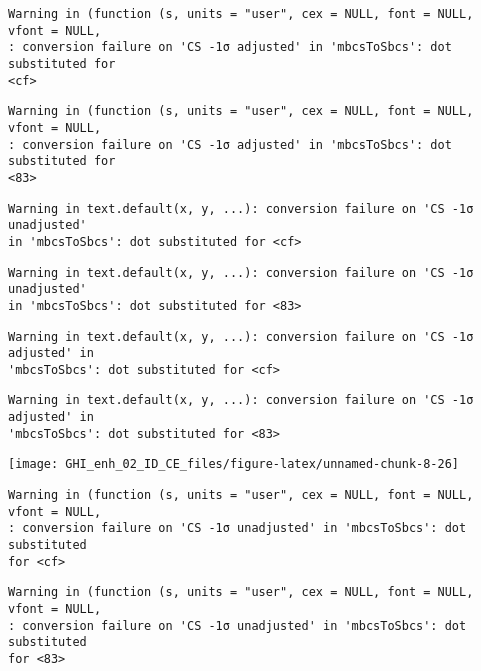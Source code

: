 \documentclass[
  10pt,
  a4paper,oneside]{article}
\begin{document}
\begin{verbatim}
Warning in (function (s, units = "user", cex = NULL, font = NULL, vfont = NULL,
: conversion failure on 'CS -1σ adjusted' in 'mbcsToSbcs': dot substituted for
<cf>
\end{verbatim}

\begin{verbatim}
Warning in (function (s, units = "user", cex = NULL, font = NULL, vfont = NULL,
: conversion failure on 'CS -1σ adjusted' in 'mbcsToSbcs': dot substituted for
<83>
\end{verbatim}

\begin{verbatim}
Warning in text.default(x, y, ...): conversion failure on 'CS -1σ unadjusted'
in 'mbcsToSbcs': dot substituted for <cf>
\end{verbatim}

\begin{verbatim}
Warning in text.default(x, y, ...): conversion failure on 'CS -1σ unadjusted'
in 'mbcsToSbcs': dot substituted for <83>
\end{verbatim}

\begin{verbatim}
Warning in text.default(x, y, ...): conversion failure on 'CS -1σ adjusted' in
'mbcsToSbcs': dot substituted for <cf>
\end{verbatim}

\begin{verbatim}
Warning in text.default(x, y, ...): conversion failure on 'CS -1σ adjusted' in
'mbcsToSbcs': dot substituted for <83>
\end{verbatim}

\begin{center}\texttt{[image: GHI\_enh\_02\_ID\_CE\_files/figure-latex/unnamed-chunk-8-26]} \end{center}

\begin{verbatim}
Warning in (function (s, units = "user", cex = NULL, font = NULL, vfont = NULL,
: conversion failure on 'CS -1σ unadjusted' in 'mbcsToSbcs': dot substituted
for <cf>
\end{verbatim}

\begin{verbatim}
Warning in (function (s, units = "user", cex = NULL, font = NULL, vfont = NULL,
: conversion failure on 'CS -1σ unadjusted' in 'mbcsToSbcs': dot substituted
for <83>
\end{verbatim}
\end{document}
